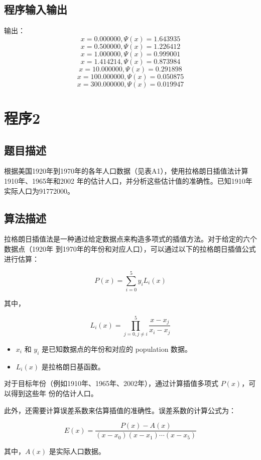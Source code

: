 \documentclass[b5paper;twoside]{article}
\begin{document}
\subsection{程序输入输出}

输出：
\[
x = 0.000000, \Psi(x) = 1.643935
\]
\[
x = 0.500000, \Psi(x) = 1.226412
\]
\[
x = 1.000000, \Psi(x) = 0.999001
\]
\[
x = 1.414214, \Psi(x) = 0.873984
\]
\[
x = 10.000000, \Psi(x) = 0.291898
\]
\[
x = 100.000000, \Psi(x) = 0.050875
\]
\[
x = 300.000000, \Psi(x) = 0.019947
\]

\section{程序2}

\subsection{题目描述}

根据美国1920年到1970年的各年人口数据（见表A1），使用拉格朗日插值法计算1910年、1965年和2002
年的估计人口，并分析这些估计值的准确性。已知1910年实际人口为91772000。

\subsection{算法描述}

拉格朗日插值法是一种通过给定数据点来构造多项式的插值方法。对于给定的六个数据点（1920年
到1970年的年份和对应人口），可以通过以下的拉格朗日插值公式进行估算：

\[
P(x) = \sum_{i=0}^{5} y_i L_i(x)
\]

其中，

\[
L_i(x) = \prod_{j=0, j \neq i}^{5} \frac{x - x_j}{x_i - x_j}
\]

\begin{itemize}
	\item $x_i$ 和 $y_i$ 是已知数据点的年份和对应的 population 数据。
	\item $L_i(x)$ 是拉格朗日基函数。
\end{itemize}

对于目标年份（例如1910年、1965年、2002年），通过计算插值多项式 $P(x)$，可以得到这些年
份的估计人口。

此外，还需要计算误差系数来估算插值的准确性。误差系数的计算公式为：

\[
E(x) = \frac{P(x) - A(x)}{(x - x_0)(x - x_1)\cdots(x - x_5)}
\]

其中，$A(x)$ 是实际人口数据。
\end{document}
